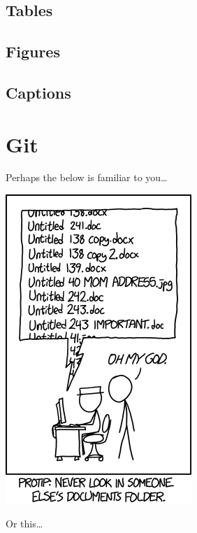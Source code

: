 \documentclass[
]{book}
\begin{document}
\hypertarget{tables}{%
\section{Tables}\label{tables}}

\hypertarget{figures}{%
\section{Figures}\label{figures}}

\hypertarget{captions}{%
\section{Captions}\label{captions}}

\hypertarget{git}{%
\chapter{Git}\label{git}}

Perhaps the below is familiar to you\ldots{}

\includegraphics{img/version_control.png}

Or this\ldots{}
\end{document}
